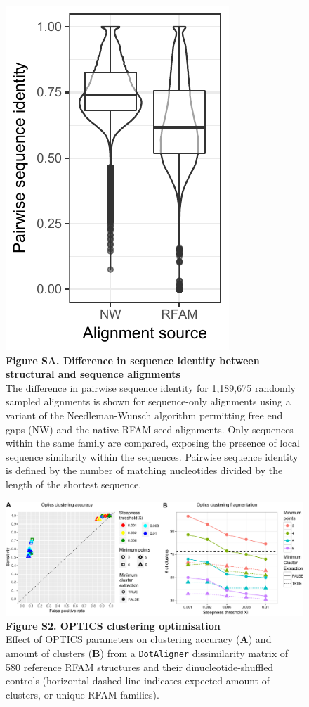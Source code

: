 \documentclass{bmcart}
\newcommand\dotaligner{\texttt{DotAligner}}
\begin{document}
\begin{figure}
 \includegraphics{RFAM_vs_NW}
 \caption*{ \textbf{ Figure SA. Difference in sequence identity between structural and sequence alignments}\\
The difference in pairwise sequence identity for 1,189,675 randomly sampled alignments is shown for 
sequence-only alignments using a variant of the Needleman-Wunsch algorithm
permitting free end gaps (NW) and the native RFAM seed alignments. 
Only sequences within the same family are compared, exposing the presence of  
local sequence similarity within the sequences. 
Pairwise sequence identity is defined by the number of matching nucleotides divided by the length of the 
shortest sequence. 
}
\end{figure}

\begin{figure}
 \includegraphics[width=\textwidth]{SF2}
 \caption*{ \textbf{ Figure S2. OPTICS clustering optimisation }\\
Effect of OPTICS parameters on clustering accuracy (\textbf{A}) and amount 
 of clusters (\textbf{B}) from a \dotaligner{} dissimilarity matrix of 580 reference RFAM 
 structures and their dinucleotide-shuffled controls (horizontal dashed line indicates 
 expected amount of clusters, or unique RFAM families). }
\end{figure}
\end{document}
